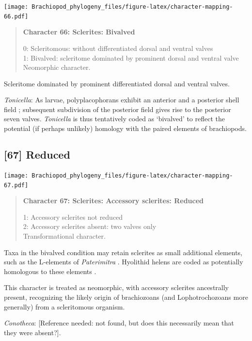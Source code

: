 \documentclass[openany]{book}
\begin{document}
\texttt{[image: Brachiopod\_phylogeny\_files/figure-latex/character-mapping-66.pdf]}

\begin{quote}
\textbf{Character 66: Sclerites: Bivalved}

0: Scleritomous: without differentiated dorsal and ventral valves\\
1: Bivalved: scleritome dominated by prominent dorsal and ventral
valve\\
Neomorphic character.
\end{quote}

Scleritome dominated by prominent differentiated dorsal and ventral
valves.

\hypertarget{Tonicella-coding-66}{}
\emph{Tonicella}: As larvae, polyplacophorans exhibit an anterior and a
posterior shell field \citep{Wanninger2002C}; subsequent subdivision of
the posterior field gives rise to the posterior seven valves.
\emph{Tonicella} is thus tentatively coded as `bivalved' to reflect the
potential (if perhaps unlikely) homology with the paired elements of
brachiopods.

\subsection*{{[}67{]} Reduced}\label{reduced}

\texttt{[image: Brachiopod\_phylogeny\_files/figure-latex/character-mapping-67.pdf]}

\begin{quote}
\textbf{Character 67: Sclerites: Accessory sclerites: Reduced}

1: Accessory sclerites not reduced\\
2: Accessory sclerites absent: two valves only\\
Transformational character.
\end{quote}

Taxa in the bivalved condition may retain sclerites as small additional
elements, such as the L-elements of \emph{Paterimitra}
\citep{Skovsted2015Theearly}. Hyolithid helens are coded as potentially
homologous to these elements
\citep[following][]{Moysiuk2017Hyolithsare}.

This character is treated as neomorphic, with accessory sclerites
ancestrally present, recognizing the likely origin of brachiozoans (and
Lophotrochozoans more generally) from a scleritomous organism.

\hypertarget{Conotheca-coding-67}{}
\emph{Conotheca}: {[}Reference needed: not found, but does this
necessarily mean that they were absent?{]}.
\end{document}
